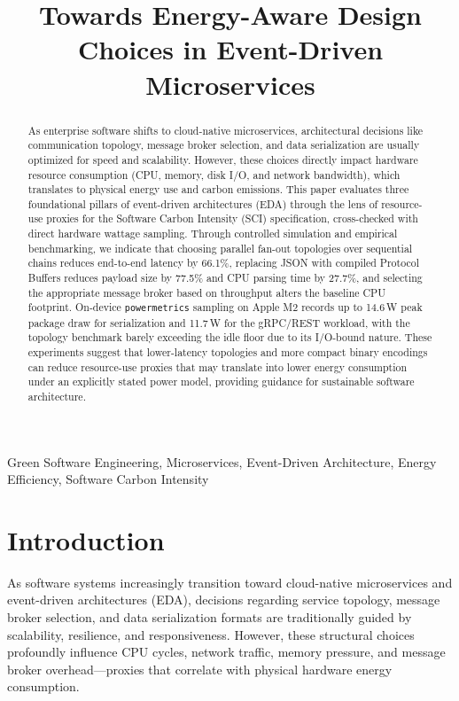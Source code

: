 \documentclass[conference]{IEEEtran}
\begin{document}
\title{Towards Energy-Aware Design Choices in Event-Driven Microservices}

\author{
}

\maketitle

\begin{abstract}
As enterprise software shifts to cloud-native microservices, architectural decisions like communication topology, message broker selection, and data serialization are usually optimized for speed and scalability. However, these choices directly impact hardware resource consumption (CPU, memory, disk I/O, and network bandwidth), which translates to physical energy use and carbon emissions. This paper evaluates three foundational pillars of event-driven architectures (EDA) through the lens of resource-use proxies for the Software Carbon Intensity (SCI) specification, cross-checked with direct hardware wattage sampling. Through controlled simulation and empirical benchmarking, we indicate that choosing parallel fan-out topologies over sequential chains reduces end-to-end latency by 66.1\%, replacing JSON with compiled Protocol Buffers reduces payload size by 77.5\% and CPU parsing time by 27.7\%, and selecting the appropriate message broker based on throughput alters the baseline CPU footprint. On-device \texttt{powermetrics} sampling on Apple M2 records up to 14.6\,W peak package draw for serialization and 11.7\,W for the gRPC/REST workload, with the topology benchmark barely exceeding the idle floor due to its I/O-bound nature. These experiments suggest that lower-latency topologies and more compact binary encodings can reduce resource-use proxies that may translate into lower energy consumption under an explicitly stated power model, providing guidance for sustainable software architecture.
\end{abstract}

\begin{IEEEkeywords}
Green Software Engineering, Microservices, Event-Driven Architecture, Energy Efficiency, Software Carbon Intensity
\end{IEEEkeywords}

\section{Introduction}
As software systems increasingly transition toward cloud-native microservices and event-driven architectures (EDA), decisions regarding service topology, message broker selection, and data serialization formats are traditionally guided by scalability, resilience, and responsiveness. However, these structural choices profoundly influence CPU cycles, network traffic, memory pressure, and message broker overhead---proxies that correlate with physical hardware energy consumption. 
\end{document}
